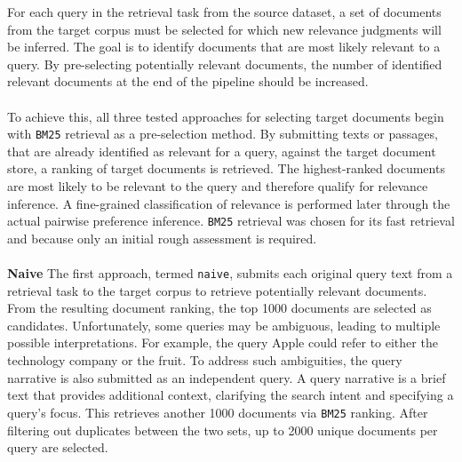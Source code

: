 For each query in the retrieval task from the source dataset, a set of documents from the target corpus must be selected for which new relevance judgments will be inferred. The goal is to identify documents that are most likely relevant to a query. By pre-selecting potentially relevant documents, the number of identified relevant documents at the end of the pipeline should be increased.
\\\\
To achieve this, all three tested approaches for selecting target documents begin with \texttt{BM25} retrieval as a pre-selection method. By submitting texts or passages, that are already identified as relevant for a query, against the target document store, a ranking of target documents is retrieved. The highest-ranked documents are most likely to be relevant to the query and therefore qualify for relevance inference. A fine-grained classification of relevance is performed later through the actual pairwise preference inference. \texttt{BM25} retrieval was chosen for its fast retrieval and because only an initial rough assessment is required.
\\\\
\textbf{Naive} The first approach, termed \texttt{naive}, submits each original query text from a retrieval task to the target corpus to retrieve potentially relevant documents. From the resulting document ranking, the top 1000 documents are selected as candidates. Unfortunately, some queries may be ambiguous, leading to multiple possible interpretations. For example, the query \glqq Apple\grqq{} could refer to either the technology company or the fruit. To address such ambiguities, the query narrative is also submitted as an independent query. A query narrative is a brief text that provides additional context, clarifying the search intent and specifying a query's focus. This retrieves another 1000 documents via \texttt{BM25} ranking. After filtering out duplicates between the two sets, up to 2000 unique documents per query are selected.
\\\\
